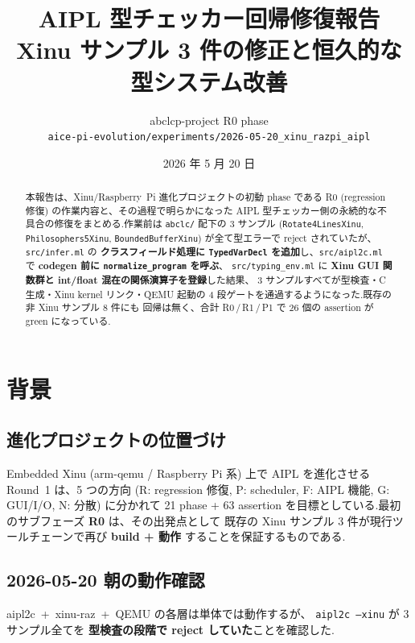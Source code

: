 \documentclass[11pt,a4paper]{article}
\title{\bfseries AIPL 型チェッカー回帰修復報告 \\
       \large Xinu サンプル 3 件の修正と恒久的な型システム改善}
\author{abclcp-project R0 phase\\
        \texttt{aice-pi-evolution/experiments/2026-05-20\_xinu\_razpi\_aipl}}
\date{2026 年 5 月 20 日}
\begin{document}
\maketitle

\begin{abstract}
\noindent
本報告は、Xinu/Raspberry~Pi 進化プロジェクトの初動 phase である R0
(regression 修復) の作業内容と、その過程で明らかになった
AIPL 型チェッカー側の永続的な不具合の修復をまとめる.作業前は
\texttt{abclc/} 配下の 3 サンプル
(\texttt{Rotate4LinesXinu}, \texttt{Philosophers5Xinu},
\texttt{BoundedBufferXinu}) が全て型エラーで reject されていたが、
\texttt{src/infer.ml} の\textbf{ クラスフィールド処理に
\texttt{TypedVarDecl} を追加}し、\texttt{src/aipl2c.ml}
で\textbf{ codegen 前に \texttt{normalize\_program} を呼ぶ}、
\texttt{src/typing\_env.ml} に\textbf{ Xinu GUI 関数群と
int/float 混在の関係演算子を登録}した結果、
3 サンプルすべてが型検査・C 生成・Xinu kernel リンク・QEMU 起動の
4 段ゲートを通過するようになった.既存の非 Xinu サンプル 8 件にも
回帰は無く、合計 R0\,/\,R1\,/\,P1 で 26 個の assertion が green
になっている.
\end{abstract}

\section{背景}

\subsection{進化プロジェクトの位置づけ}

Embedded Xinu (arm-qemu / Raspberry Pi 系) 上で AIPL を進化させる
Round~1 は、5 つの方向 (R: regression 修復, P: scheduler,
F: AIPL 機能, G: GUI/I/O, N: 分散) に分かれて 21 phase + 63 assertion
を目標としている.最初のサブフェーズ\textbf{ R0} は、その出発点として
既存の Xinu サンプル 3 件が現行ツールチェーンで再び\textbf{ build + 動作}
することを保証するものである.

\subsection{2026-05-20 朝の動作確認}

aipl2c~+~xinu-raz~+~QEMU の各層は単体では動作するが、
\texttt{aipl2c --xinu} が 3 サンプル全てを\textbf{ 型検査の段階で
reject していた}ことを確認した.
\end{document}
